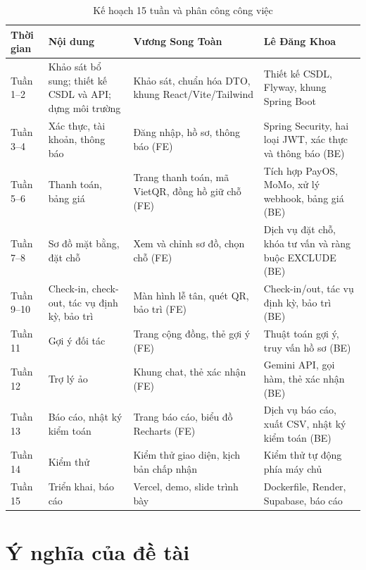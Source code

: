 \begin{table}[!htbp]
\centering
\caption{Kế hoạch 15 tuần và phân công công việc}
\label{tab:kehoach}
\small
\renewcommand{\arraystretch}{1.15}
\begin{tabularx}{\linewidth}{|P{1.7cm}|L|L|L|}
\hline
\textbf{Thời gian} & \textbf{Nội dung} & \textbf{Vương Song Toàn} & \textbf{Lê Đăng Khoa} \\
\hline
Tuần 1--2 & Khảo sát bổ sung; thiết kế CSDL và API; dựng môi trường & Khảo sát, chuẩn hóa DTO, khung React/Vite/Tailwind & Thiết kế CSDL, Flyway, khung Spring Boot \\
\hline
Tuần 3--4 & Xác thực, tài khoản, thông báo & Đăng nhập, hồ sơ, thông báo (FE) & Spring Security, hai loại JWT, xác thực và thông báo (BE) \\
\hline
Tuần 5--6 & Thanh toán, bảng giá & Trang thanh toán, mã VietQR, đồng hồ giữ chỗ (FE) & Tích hợp PayOS, MoMo, xử lý webhook, bảng giá (BE) \\
\hline
Tuần 7--8 & Sơ đồ mặt bằng, đặt chỗ & Xem và chỉnh sơ đồ, chọn chỗ (FE) & Dịch vụ đặt chỗ, khóa tư vấn và ràng buộc EXCLUDE (BE) \\
\hline
Tuần 9--10 & Check-in, check-out, tác vụ định kỳ, bảo trì & Màn hình lễ tân, quét QR, bảo trì (FE) & Check-in/out, tác vụ định kỳ, bảo trì (BE) \\
\hline
Tuần 11 & Gợi ý đối tác & Trang cộng đồng, thẻ gợi ý (FE) & Thuật toán gợi ý, truy vấn hồ sơ (BE) \\
\hline
Tuần 12 & Trợ lý ảo & Khung chat, thẻ xác nhận (FE) & Gemini API, gọi hàm, thẻ xác nhận (BE) \\
\hline
Tuần 13 & Báo cáo, nhật ký kiểm toán & Trang báo cáo, biểu đồ Recharts (FE) & Dịch vụ báo cáo, xuất CSV, nhật ký kiểm toán (BE) \\
\hline
Tuần 14 & Kiểm thử & Kiểm thử giao diện, kịch bản chấp nhận & Kiểm thử tự động phía máy chủ \\
\hline
Tuần 15 & Triển khai, báo cáo & Vercel, demo, slide trình bày & Dockerfile, Render, Supabase, báo cáo \\
\hline
\end{tabularx}
\end{table}

\section{Ý nghĩa của đề tài}
\label{sec:ynghia}

